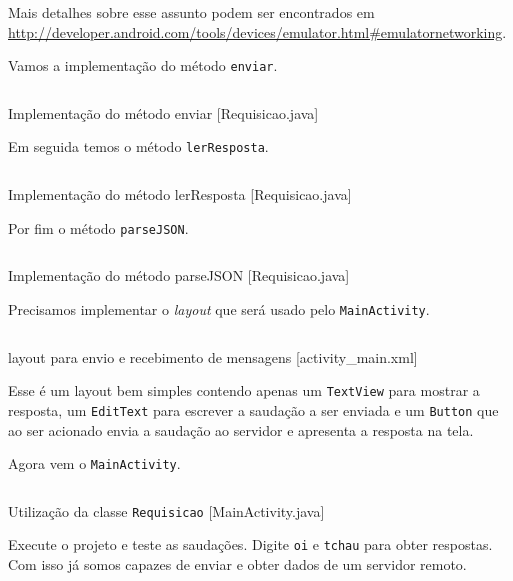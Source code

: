 Mais detalhes sobre esse assunto podem ser encontrados em
\url{http://developer.android.com/tools/devices/emulator.html#emulatornetworking}.

Vamos a implementação do método \texttt{enviar}.

\begin{listing}[H]
  \inputminted[linenos=true,frame=bottomline,tabsize=3]{ java }{ source/Requisicao-2.java }
  \caption{Implementação do método enviar [Requisicao.java]}
\end{listing}

Em seguida temos o método \texttt{lerResposta}.

\begin{listing}[H]
  \inputminted[linenos=true,frame=bottomline,tabsize=3]{ java }{ source/Requisicao-3.java }
  \caption{Implementação do método lerResposta [Requisicao.java]}
\end{listing}

Por fim o método \texttt{parseJSON}.

\begin{listing}[H]
  \inputminted[linenos=true,frame=bottomline,tabsize=3]{ java }{ source/Requisicao-4.java }
  \caption{Implementação do método parseJSON [Requisicao.java]}
\end{listing}

Precisamos implementar o \emph{layout} que será usado pelo
\texttt{MainActivity}.

\begin{listing}[H]
  \inputminted[linenos=true,frame=bottomline,tabsize=3]{ xml }{ source/activity_main-1.xml }
  \caption{layout para envio e recebimento de mensagens [activity_main.xml]}
\end{listing}

Esse é um layout bem simples contendo apenas um \texttt{TextView} para
mostrar a resposta, um \texttt{EditText} para escrever a saudação a ser
enviada e um \texttt{Button} que ao ser acionado envia a saudação ao
servidor e apresenta a resposta na tela.

Agora vem o \texttt{MainActivity}.

\begin{listing}[H]
  \inputminted[linenos=true,frame=bottomline,tabsize=3]{ java }{ source/MainActivity-15.java }
  \caption{Utilização da classe \texttt{Requisicao} [MainActivity.java]}
\end{listing}

Execute o projeto e teste as saudações. Digite \texttt{oi} e
\texttt{tchau} para obter respostas. Com isso já somos capazes de enviar
e obter dados de um servidor remoto.

